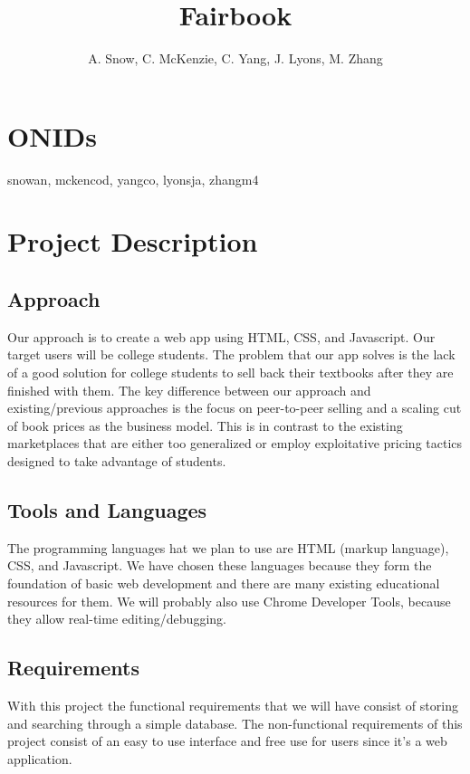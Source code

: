 \documentclass[12pt]{article}
\title{Fairbook}
\author{A. Snow, C. McKenzie, C. Yang, J. Lyons, M. Zhang}
\begin{document}
	\maketitle
	
	\tableofcontents
		\section{ONIDs}
		snowan, mckencod, yangco, lyonsja, zhangm4


	\section{Project Description}

		\subsection{Approach}
Our approach is to create a web app using HTML, CSS, and Javascript. Our target users will be college students. The problem that our app solves is the lack of a good solution for college students to sell back their textbooks after they are finished with them. The key difference between our approach and existing/previous approaches is the focus on peer-to-peer selling and a scaling cut of book prices as the business model. This is in contrast to the existing marketplaces that are either too generalized or employ exploitative pricing tactics designed to take advantage of students.

		\subsection{Tools and Languages}
The programming languages hat we plan to use are HTML (markup language), CSS, and Javascript. We have chosen these languages because they form the foundation of basic web development and there are many existing educational resources for them. We will probably also use Chrome Developer Tools, because they allow real-time editing/debugging.

		\subsection{Requirements}
With this project the functional requirements that we will have consist of storing and searching through a simple database. The non-functional requirements of this project consist of an easy to use interface and free use for users since it’s a web application.
\end{document}
